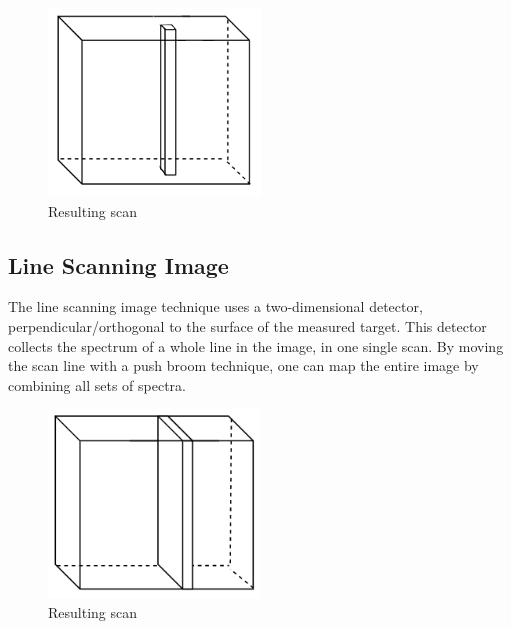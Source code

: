 \begin{figure}[H]
\centering
  \includegraphics[height=5cm]{Images/theory/voxel.png}
  \caption{ Resulting scan}
  \label{fig:voxel2}
\end{figure}


\subsection{Line Scanning Image} \label{sec:push}
The line scanning image technique uses a two-dimensional detector, perpendicular/orthogonal to the surface of the measured target. This detector collects the spectrum of a whole line in the image, in one single scan. By moving the scan line with a push broom technique, one can map the entire image by combining all sets of spectra.


\begin{figure}[H]
\centering
  \includegraphics[height=5cm]{Images/theory/pushbroom.png}
  \caption{ Resulting scan}
  \label{fig:pushbroom}
\end{figure}

\vspace{1.3cm}
